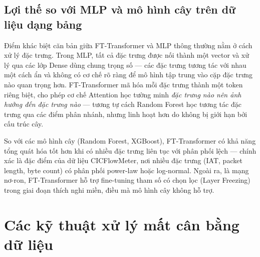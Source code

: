 \documentclass[../DoAn.tex]{subfiles}
\begin{document}
\subsection{Lợi thế so với MLP và mô hình cây trên dữ liệu dạng bảng}
\label{subsec:ftt-compare}

Điểm khác biệt căn bản giữa FT-Transformer và MLP thông thường nằm ở cách xử lý đặc trưng. Trong MLP, tất cả đặc trưng được nối thành một vector và xử lý qua các lớp Dense dùng chung trọng số --- các đặc trưng tương tác với nhau một cách ẩn và không có cơ chế rõ ràng để mô hình tập trung vào cặp đặc trưng nào quan trọng hơn. FT-Transformer mã hóa mỗi đặc trưng thành một token riêng biệt, cho phép cơ chế Attention học tường minh \textit{đặc trưng nào nên ảnh hưởng đến đặc trưng nào} --- tương tự cách Random Forest học tương tác đặc trưng qua các điểm phân nhánh, nhưng linh hoạt hơn do không bị giới hạn bởi cấu trúc cây.

So với các mô hình cây (Random Forest, XGBoost), FT-Transformer có khả năng tổng quát hóa tốt hơn khi có nhiều đặc trưng liên tục với phân phối lệch --- chính xác là đặc điểm của dữ liệu CICFlowMeter, nơi nhiều đặc trưng (IAT, packet length, byte count) có phân phối power-law hoặc log-normal. Ngoài ra, là mạng nơ-ron, FT-Transformer hỗ trợ fine-tuning tham số có chọn lọc (Layer Freezing) trong giai đoạn thích nghi miền, điều mà mô hình cây không hỗ trợ.

\begin{table}[H]
    \centering
    \caption{So sánh các kiến trúc trên dữ liệu dạng bảng}
    \label{tab:arch-compare}
\end{table}

\section{Các kỹ thuật xử lý mất cân bằng dữ liệu}
\label{sec:imbalance}
\end{document}

